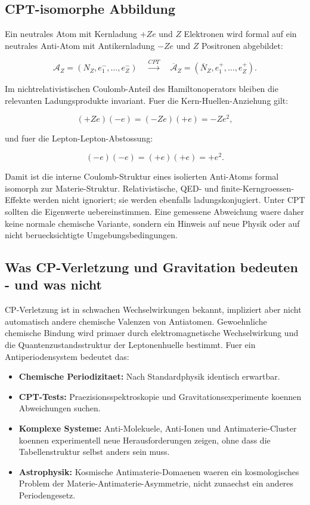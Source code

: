 \documentclass[11pt,a4paper]{article}
\begin{document}
\subsection{CPT-isomorphe Abbildung}

Ein neutrales Atom mit Kernladung $+Ze$ und $Z$ Elektronen wird formal auf ein neutrales Anti-Atom mit Antikernladung $-Ze$ und $Z$ Positronen abgebildet:

\begin{equation}
\mathcal{A}_Z = \left(N_Z, e^-_1,\ldots,e^-_Z\right)
\quad \xrightarrow{CPT} \quad
\overline{\mathcal{A}}_Z = \left(\overline{N}_Z, e^+_1,\ldots,e^+_Z\right).
\end{equation}

Im nichtrelativistischen Coulomb-Anteil des Hamiltonoperators bleiben die relevanten Ladungsprodukte invariant. Fuer die Kern-Huellen-Anziehung gilt:

\begin{equation}
(+Ze)(-e)=(-Ze)(+e)=-Ze^2,
\end{equation}

und fuer die Lepton-Lepton-Abstossung:

\begin{equation}
(-e)(-e)=(+e)(+e)=+e^2.
\end{equation}

Damit ist die interne Coulomb-Struktur eines isolierten Anti-Atoms formal isomorph zur Materie-Struktur. Relativistische, QED- und finite-Kerngroessen-Effekte werden nicht ignoriert; sie werden ebenfalls ladungskonjugiert. Unter CPT sollten die Eigenwerte uebereinstimmen. Eine gemessene Abweichung waere daher keine normale chemische Variante, sondern ein Hinweis auf neue Physik oder auf nicht beruecksichtigte Umgebungsbedingungen.

\subsection{Was CP-Verletzung und Gravitation bedeuten - und was nicht}

CP-Verletzung ist in schwachen Wechselwirkungen bekannt, impliziert aber nicht automatisch andere chemische Valenzen von Antiatomen. Gewoehnliche chemische Bindung wird primaer durch elektromagnetische Wechselwirkung und die Quantenzustandsstruktur der Leptonenhuelle bestimmt. Fuer ein Antiperiodensystem bedeutet das:

\begin{itemize}
  \item \textbf{Chemische Periodizitaet:} Nach Standardphysik identisch erwartbar.
  \item \textbf{CPT-Tests:} Praezisionsspektroskopie und Gravitationsexperimente koennen Abweichungen suchen.
  \item \textbf{Komplexe Systeme:} Anti-Molekuele, Anti-Ionen und Antimaterie-Cluster koennen experimentell neue Herausforderungen zeigen, ohne dass die Tabellenstruktur selbst anders sein muss.
  \item \textbf{Astrophysik:} Kosmische Antimaterie-Domaenen waeren ein kosmologisches Problem der Materie-Antimaterie-Asymmetrie, nicht zunaechst ein anderes Periodengesetz.
\end{itemize}
\end{document}
